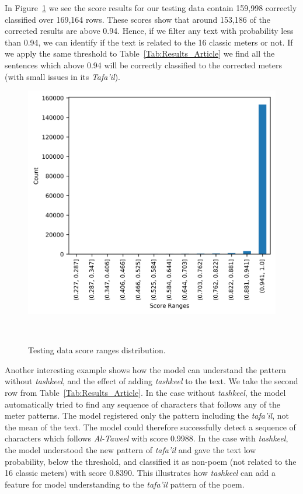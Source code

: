 In Figure~\ref{Fig:Results_Distribution} we see the score results for our testing data contain 159,998 correctly classified over 169,164 rows. These scores show that around 153,186 of the corrected results are above 0.94. Hence, if we filter any text with probability less than 0.94, we can identify if the text is related to the 16 classic meters or not. If we apply the same threshold to Table~\ref{Tab:Results_Article} we find all the sentences which above 0.94 will be correctly classified to the corrected meters (with small issues in its \textit{Tafa’il}).


\begin{figure}[!t]
 \includegraphics{./Figures/Ch_7_Results/IMG_Result_Distribution.png}
 \caption{Testing data score ranges distribution.}~\label{Fig:Results_Distribution}
\end{figure}


Another interesting example shows how the model can understand the pattern without \textit{tashkeel}, and the effect of adding \textit{tashkeel} to the text. We take the second row from Table~\ref{Tab:Results_Article}. In the case without \textit{tashkeel}, the model automatically tried to find any sequence of characters that follows any of the meter patterns. The model registered only the pattern including the \textit{tafa'il}, not the mean of the text. The model could therefore successfully detect a sequence of characters which follows \textit{Al-Taweel} with score 0.9988. In the case with \textit{tashkeel}, the model understood the new pattern of \textit{tafa'il} and gave the text low probability, below the threshold, and classified it as non-poem (not related to the 16 classic meters) with score 0.8390. This illustrates how \textit{tashkeel} can add a feature for model understanding to the \textit{tafa'il} pattern of the poem.

